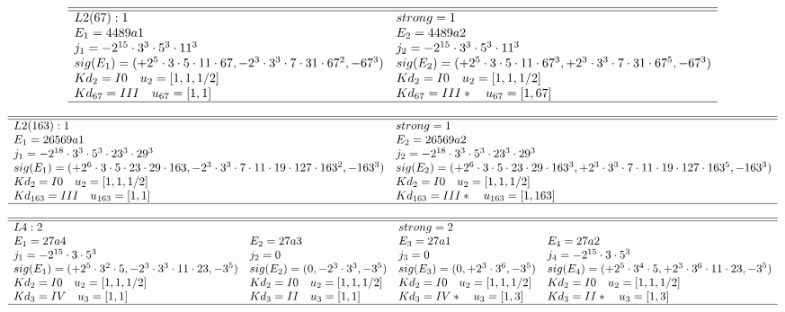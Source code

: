 \documentclass[11pt]{article}
\theoremstyle{definition}
\begin{document}
$$
 \begin{array}{ll}
 \hline 
\hline 
  L2(67):1  & strong=1\\
 E_1=4489a1 & E_2=4489a2 \\
 j_1=-2^{15}\cdot 3^{3}\cdot 5^{3}\cdot 11^{3} & j_2=-2^{15}\cdot 3^{3}\cdot 5^{3}\cdot 11^{3} \\
 sig(E_1)=(+2^{5}\cdot 3\cdot 5\cdot 11\cdot 67,-2^{3}\cdot 3^{3}\cdot 7\cdot 
31\cdot 67^{2},-67^{3}) & sig(E_2)=(+2^{5}\cdot 3\cdot 5\cdot 11\cdot 67^{3},+2^{3}\cdot 3^{3}\cdot 
7\cdot 31\cdot 67^{5},-67^{3}) \\
  Kd_{2}=I0\quad u_{2}=[ 1, 1, 1/2 ]&  Kd_{2}=I0\quad u_{2}=[ 1, 1, 1/2 ]\\
  Kd_{67}=III\quad u_{67}=[ 1, 1 ]&  Kd_{67}=III*\quad u_{67}=[ 1, 67 ]\\
\hline
\end{array}
 $$


$$
 \begin{array}{ll}
 \hline 
\hline 
  L2(163):1  & strong=1\\
 E_1=26569a1 & E_2=26569a2 \\
 j_1=-2^{18}\cdot 3^{3}\cdot 5^{3}\cdot 23^{3}\cdot 29^{3} & j_2=-2^{18}\cdot 3^{3}\cdot 5^{3}\cdot 23^{3}\cdot 29^{3} \\
 sig(E_1)=(+2^{6}\cdot 3\cdot 5\cdot 23\cdot 29\cdot 163,-2^{3}\cdot 3^{3}\cdot 
7\cdot 11\cdot 19\cdot 127\cdot 163^{2},-163^{3}) & sig(E_2)=(+2^{6}\cdot 3\cdot 5\cdot 23\cdot 29\cdot 163^{3},+2^{3}\cdot 
3^{3}\cdot 7\cdot 11\cdot 19\cdot 127\cdot 163^{5},-163^{3}) \\
  Kd_{2}=I0\quad u_{2}=[ 1, 1, 1/2 ]&  Kd_{2}=I0\quad u_{2}=[ 1, 1, 1/2 ]\\
  Kd_{163}=III\quad u_{163}=[ 1, 1 ]&  Kd_{163}=III*\quad u_{163}=[ 1, 163 ]\\
\hline
\end{array}
 $$


$$
 \begin{array}{llll}
 \hline 
\hline 
  L4:2  &   & strong=2\\
 E_1=27a4 & E_2=27a3 & E_3=27a1 & E_4=27a2 \\
 j_1=-2^{15}\cdot 3\cdot 5^{3} & j_2=0 & j_3=0 & j_4=-2^{15}\cdot 3\cdot 5^{3} \\
 sig(E_1)=(+2^{5}\cdot 3^{2}\cdot 5,-2^{3}\cdot 3^{3}\cdot 11\cdot 23,-3^{5}) & sig(E_2)=(0,-2^{3}\cdot 3^{3},-3^{5}) & sig(E_3)=(0,+2^{3}\cdot 3^{6},-3^{5}) & sig(E_4)=(+2^{5}\cdot 3^{4}\cdot 5,+2^{3}\cdot 3^{6}\cdot 11\cdot 23,-3^{5}) \\
  Kd_{2}=I0\quad u_{2}=[ 1, 1, 1/2 ]&  Kd_{2}=I0\quad u_{2}=[ 1, 1, 1/2 ]&  Kd_{2}=I0\quad u_{2}=[ 1, 1, 1/2 ]&  Kd_{2}=I0\quad u_{2}=[ 1, 1, 1/2 ]\\
  Kd_{3}=IV\quad u_{3}=[ 1, 1 ]&  Kd_{3}=II\quad u_{3}=[ 1, 1 ]&  Kd_{3}=IV*\quad u_{3}=[ 1, 3 ]&  Kd_{3}=II*\quad u_{3}=[ 1, 3 ]\\
\hline
\end{array}
 $$
\end{document}
